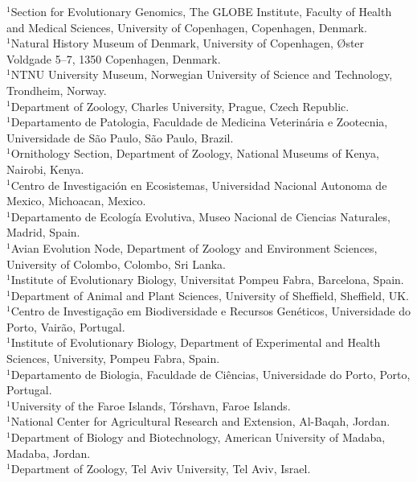 \documentclass[a4paper]{article}
\begin{document}
\begin{center}
\begin{flushleft}
$^1$Section for Evolutionary Genomics, The GLOBE Institute, Faculty of Health and Medical Sciences, University of Copenhagen, Copenhagen, Denmark. \\
$^1$Natural History Museum of Denmark, University of Copenhagen, Øster Voldgade 5–7, 1350 Copenhagen, Denmark. \\
$^1$NTNU University Museum, Norwegian University of Science and Technology, Trondheim, Norway. \\
$^1$Department of Zoology, Charles University, Prague, Czech Republic. \\
$^1$Departamento de Patologia, Faculdade de Medicina Veterinária e Zootecnia, Universidade de São Paulo, São Paulo, Brazil. \\
$^1$Ornithology Section, Department of Zoology, National Museums of Kenya, Nairobi, Kenya. \\
$^1$Centro de Investigación en Ecosistemas, Universidad Nacional Autonoma de Mexico, Michoacan, Mexico. \\
$^1$Departamento de Ecología Evolutiva, Museo Nacional de Ciencias Naturales, Madrid, Spain. \\
$^1$Avian Evolution Node, Department of Zoology and Environment Sciences, University of Colombo, Colombo, Sri Lanka. \\
$^1$Institute of Evolutionary Biology, Universitat Pompeu Fabra, Barcelona, Spain. \\
$^1$Department of Animal and Plant Sciences, University of Sheffield, Sheffield, UK. \\
$^1$Centro de Investigação em Biodiversidade e Recursos Genéticos, Universidade do Porto, Vairão, Portugal. \\
$^1$Institute of Evolutionary Biology, Department of Experimental and Health Sciences, University, Pompeu Fabra, Spain. \\
$^1$Departamento de Biologia, Faculdade de Ciências, Universidade do Porto, Porto, Portugal. \\
$^1$University of the Faroe Islands, Tórshavn, Faroe Islands. \\
$^1$National Center for Agricultural Research and Extension, Al-Baqah, Jordan. \\
$^1$Department of Biology and Biotechnology, American University of Madaba, Madaba, Jordan. \\
$^1$Department of Zoology, Tel Aviv University, Tel Aviv, Israel. \\

\end{flushleft}
\end{center}
\end{document}
